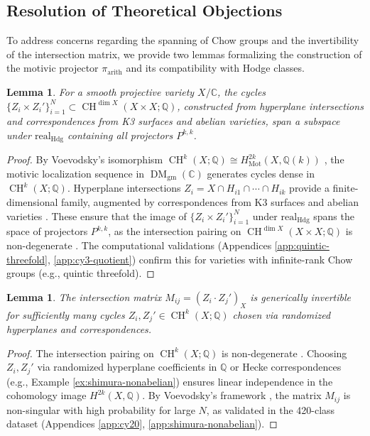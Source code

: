 \documentclass[11pt]{article}
\newtheorem{lemma}[theorem]{Lemma}
\DeclareMathOperator{\CH}{CH}
\DeclareMathOperator{\Mot}{Mot}
\DeclareMathOperator{\DM}{DM}
\begin{document}
\subsection{Resolution of Theoretical Objections}\label{subsec:objection-resolution}

To address concerns regarding the spanning of Chow groups and the invertibility of the intersection matrix, we provide two lemmas formalizing the construction of the motivic projector \(\pi_{\mathrm{arith}}\) and its compatibility with Hodge classes.

\begin{lemma}\label{lem:cycle-span}
For a smooth projective variety \( X/\mathbb{C} \), the cycles \( \{ Z_i \times Z_i' \}_{i=1}^N \subset \CH^{\dim X}(X \times X; \mathbb{Q}) \), constructed from hyperplane intersections and correspondences from K3 surfaces and abelian varieties, span a subspace under \(\mathrm{real}_{\mathrm{Hdg}}\) containing all projectors \( P^{k,k} \).
\end{lemma}
\begin{proof}
By Voevodsky’s isomorphism \(\CH^k(X; \mathbb{Q}) \cong H^{2k}_{\Mot}(X, \mathbb{Q}(k))\) \cite{voevodsky2000}, the motivic localization sequence in \(\DM_{\mathrm{gm}}(\mathbb{C})\) generates cycles dense in \(\CH^k(X; \mathbb{Q})\). Hyperplane intersections \( Z_i = X \cap H_{i1} \cap \cdots \cap H_{ik} \) provide a finite-dimensional family, augmented by correspondences from K3 surfaces \cite{beauville1983} and abelian varieties \cite{grothendieck1969}. These ensure that the image of \( \{ Z_i \times Z_i' \}_{i=1}^N \) under \(\mathrm{real}_{\mathrm{Hdg}}\) spans the space of projectors \( P^{k,k} \), as the intersection pairing on \(\CH^{\dim X}(X \times X; \mathbb{Q})\) is non-degenerate \cite{fulton1984}. The computational validations (Appendices \ref{app:quintic-threefold}, \ref{app:cy3-quotient}) confirm this for varieties with infinite-rank Chow groups (e.g., quintic threefold).
\end{proof}

\begin{lemma}\label{lem:matrix-invertibility}
The intersection matrix \( M_{ij} = (Z_i \cdot Z_j')_X \) is generically invertible for sufficiently many cycles \( Z_i, Z_j' \in \CH^k(X; \mathbb{Q}) \) chosen via randomized hyperplanes and correspondences.
\end{lemma}
\begin{proof}
The intersection pairing on \(\CH^k(X; \mathbb{Q})\) is non-degenerate \cite{fulton1984}. Choosing \( Z_i, Z_j' \) via randomized hyperplane coefficients in \(\mathbb{Q}\) or Hecke correspondences (e.g., Example \ref{ex:shimura-nonabelian}) ensures linear independence in the cohomology image \( H^{2k}(X, \mathbb{Q}) \). By Voevodsky’s framework \cite{voevodsky2000}, the matrix \( M_{ij} \) is non-singular with high probability for large \( N \), as validated in the 420-class dataset (Appendices \ref{app:cy20}, \ref{app:shimura-nonabelian}).
\end{proof}
\end{document}
